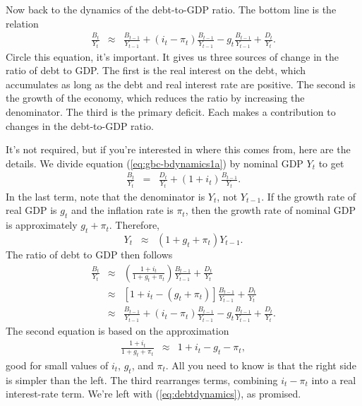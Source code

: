 Now back to the dynamics of the debt-to-GDP ratio.
The bottom line is the relation
\begin{eqnarray}
    \frac{B_{t}}{Y_{t}}
            &\approx&
                \frac{B_{t-1}}{Y_{t-1}} + (i_t-\pi_t) \frac{B_{t-1}}{Y_{t-1}}
                - g_t \frac{B_{t-1}}{Y_{t-1}}
             +    \frac{D_{t}}{Y_{t}}  .
    \label{eq:debtdynamics}
\end{eqnarray}
Circle this equation, it's important.
It gives us three sources
of change in the ratio of debt to GDP.
The first is the real interest on the debt, which accumulates
as long as the debt and real interest rate are positive.
The second is the growth of the economy,
which reduces the ratio by increasing the denominator.
The third is the primary deficit.
Each makes a contribution to changes in the debt-to-GDP ratio.


It's not required, but if you're interested in where this comes from,
here are the details.
We divide equation (\ref{eq:gbc-bdynamics1a}) by nominal GDP $Y_t$ to get
\begin{eqnarray*}
    \frac{B_{t}}{Y_{t}} &=& %
            \frac{D_{t}}{Y_{t}}
            +  (1+i_t) \frac{B_{t-1}}{Y_{t}}  .
\end{eqnarray*}
In the last term, note that the denominator is $Y_t$, not $Y_{t-1}$.
If the growth rate of real GDP is $g_t$ and the inflation rate is $\pi_t$,
then the growth rate of nominal GDP is approximately $g_t + \pi_t$.
Therefore,
\[
    Y_{t} \;\;\approx\;\; (1+g_t+\pi_t) Y_{t-1}.
\]
The ratio of debt to GDP then follows
\begin{eqnarray*}
    \frac{B_{t}}{Y_{t}}
            &\approx&
                \left( \frac{1+i_t}{1+g_t+\pi_t} \right)  \frac{B_{t-1}}{Y_{t-1}}
             +    \frac{D_{t}}{Y_{t}}  \nonumber \\
            &\approx&
                \left[ 1 + i_t - (g_t+\pi_t) \right]  \frac{B_{t-1}}{Y_{t-1}}
             +    \frac{D_{t}}{Y_{t}}   \nonumber \\
            &\approx&
                \frac{B_{t-1}}{Y_{t-1}} + (i_t-\pi_t) \frac{B_{t-1}}{Y_{t-1}}
                - g_t \frac{B_{t-1}}{Y_{t-1}}
             +    \frac{D_{t}}{Y_{t}}  .
\end{eqnarray*}
The second equation is based on the approximation
\begin{eqnarray*}
    \frac{1+i_t}{1+g_t+\pi_t} &\approx& 1 + i_t - g_t - \pi_t ,
\end{eqnarray*}
good for small values of $i_t$, $g_t$, and $\pi_t$.
All you need to know is that the right side is simpler than the left.
The third rearranges terms, combining $i_t-\pi_t$ into a real
interest-rate term.
We're left with (\ref{eq:debtdynamics}), as promised.


